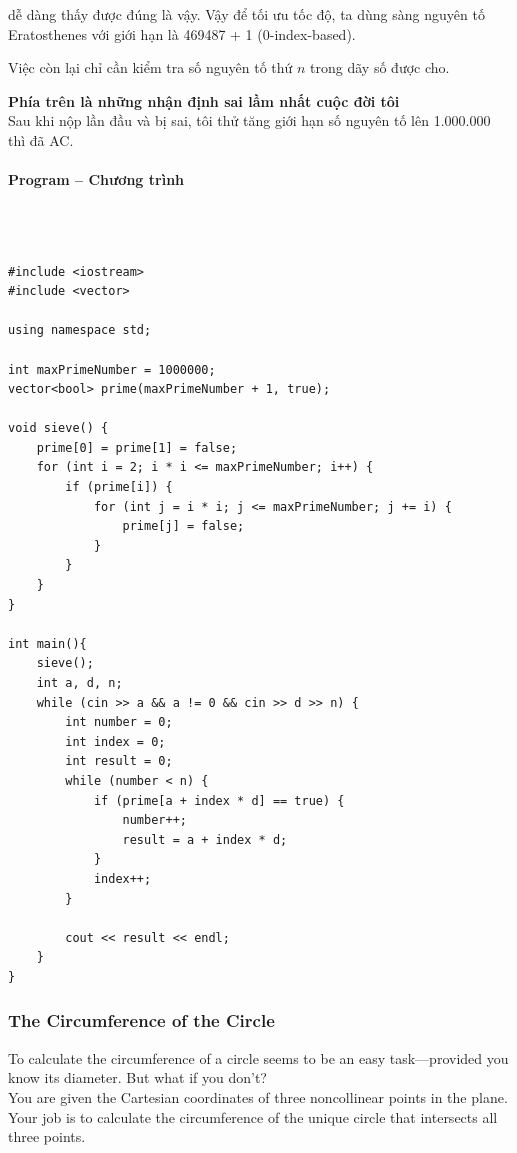 \documentclass{article}
\begin{document}
dễ dàng thấy được đúng là vậy. Vậy để tối ưu tốc độ, ta dùng sàng nguyên tố Eratosthenes với giới hạn là 469487 + 1 (0-index-based).

Việc còn lại chỉ cần kiểm tra số nguyên tố thứ $n$ trong dãy số được cho.


\textbf{Phía trên là những nhận định sai lầm nhất cuộc đời tôi}\\

Sau khi nộp lần đầu và bị sai, tôi thử tăng giới hạn số nguyên tố lên 1.000.000 thì đã AC.
\paragraph{Program -- Chương trình} \mbox{} \\


\begin{lstlisting}

#include <iostream>
#include <vector>

using namespace std;
	
int maxPrimeNumber = 1000000;
vector<bool> prime(maxPrimeNumber + 1, true);

void sieve() {
	prime[0] = prime[1] = false;
	for (int i = 2; i * i <= maxPrimeNumber; i++) {
		if (prime[i]) {
			for (int j = i * i; j <= maxPrimeNumber; j += i) {
				prime[j] = false;
			}
		}
	}
}

int main(){
	sieve();
	int a, d, n; 
	while (cin >> a && a != 0 && cin >> d >> n) {
		int number = 0;
		int index = 0;
		int result = 0;
		while (number < n) {
			if (prime[a + index * d] == true) {
				number++;
				result = a + index * d;
			}
			index++;
		}
		
		cout << result << endl;
	}
}
\end{lstlisting}


\subsubsection{The Circumference of the Circle}

To calculate the circumference of a circle seems to be an easy task—provided you know its diameter. But what if you don’t? \\
You are given the Cartesian coordinates of three noncollinear points in the plane. \\
Your job is to calculate the circumference of the unique circle that intersects all three
points.
\end{document}
